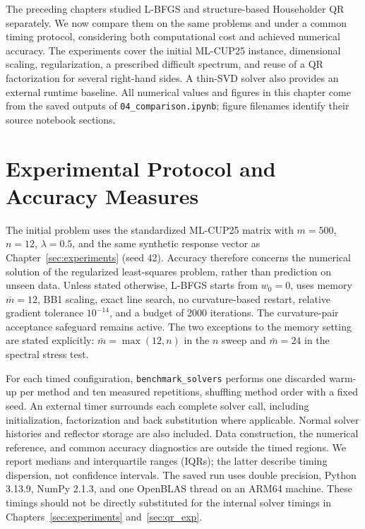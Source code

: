 \label{sec:comparison}

\noindent The preceding chapters studied L-BFGS and structure-based
Householder QR separately. We now compare them on the same problems and
under a common timing protocol, considering both computational cost and
achieved numerical accuracy. The experiments cover the initial ML-CUP25
instance, dimensional scaling, regularization, a prescribed difficult
spectrum, and reuse of a QR factorization for several right-hand sides.
A thin-SVD solver also provides an external runtime baseline.
All numerical values and figures in this chapter come from the saved
outputs of \texttt{04\_comparison.ipynb}; figure filenames identify their
source notebook sections.

\section{Experimental Protocol and Accuracy Measures}
\label{sec:comparison_protocol}

\noindent The initial problem uses the standardized ML-CUP25 matrix with
$m=500$, $n=12$, $\lambda=0.5$, and the same synthetic response vector as
Chapter~\ref{sec:experiments} (seed 42). Accuracy therefore concerns the
numerical solution of the regularized least-squares problem, rather than
prediction on unseen data. Unless stated otherwise, L-BFGS starts from
$w_0=0$, uses memory $\bar m=12$, BB1 scaling, exact line search, no
curvature-based restart, relative gradient tolerance $10^{-14}$, and a
budget of 2000 iterations. The curvature-pair acceptance safeguard remains
active. The two exceptions to the memory setting are stated explicitly:
$\bar m=\max(12,n)$ in the $n$ sweep and $\bar m=24$ in the spectral stress
test.

\noindent For each timed configuration, \texttt{benchmark\_solvers} performs
one discarded warm-up per method and ten measured repetitions, shuffling
method order with a fixed seed. An external timer surrounds each complete
solver call, including initialization, factorization and back substitution
where applicable. Normal solver histories and reflector storage are also
included. Data construction, the numerical reference, and common accuracy
diagnostics are outside the timed regions. We report medians and
interquartile ranges (IQRs); the latter describe timing dispersion, not
confidence intervals. The saved run uses double precision, Python 3.13.9,
NumPy 2.1.3, and one OpenBLAS thread on an ARM64 machine. These timings
should not be directly substituted for the internal solver timings in
Chapters~\ref{sec:experiments} and~\ref{sec:qr_exp}.

